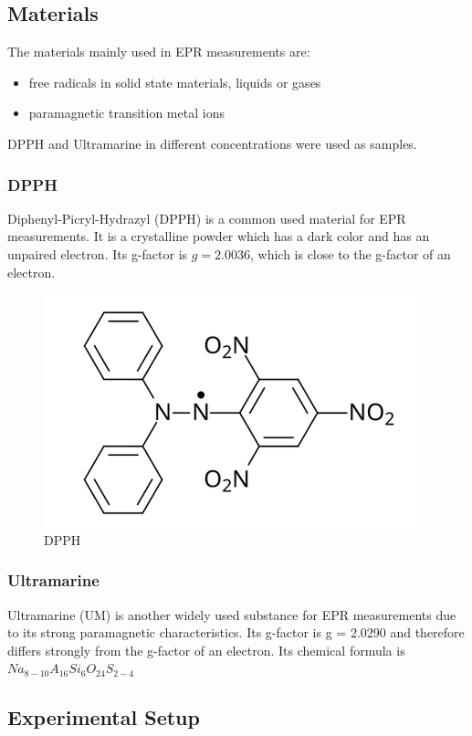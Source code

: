 \documentclass{article}
\begin{document}
\subsection{Materials}
The materials mainly used in EPR measurements are: 

\begin{itemize}
  \item free radicals in solid state materials, liquids or gases
  \item paramagnetic transition metal ions
\end{itemize}

DPPH and Ultramarine in different concentrations were used as samples.

\subsubsection{DPPH}
Diphenyl-Picryl-Hydrazyl (DPPH) is a common used material for EPR measurements. It is a crystalline powder which has a dark color and has an unpaired electron. Its g-factor is $g = 2.0036$, which is close to the g-factor of an electron.

\begin{figure}[h]
    \centering
    \includegraphics[width=0.5\linewidth]{Figures/Intro/5.png}
    \caption{DPPH \cite{a2020_dpph}}
    \label{fig:dpph}
\end{figure}

\subsubsection{Ultramarine}
Ultramarine (UM) is another widely used substance for EPR measurements due to its strong paramagnetic characteristics. Its g-factor is g = 2.0290 and therefore differs strongly from the g-factor of an electron. Its chemical formula is $Na_{8-10}A_{16}Si_{6}O_{24}S_{2-4}$


\pagebreak{}

\subsection{Experimental Setup}
\end{document}
